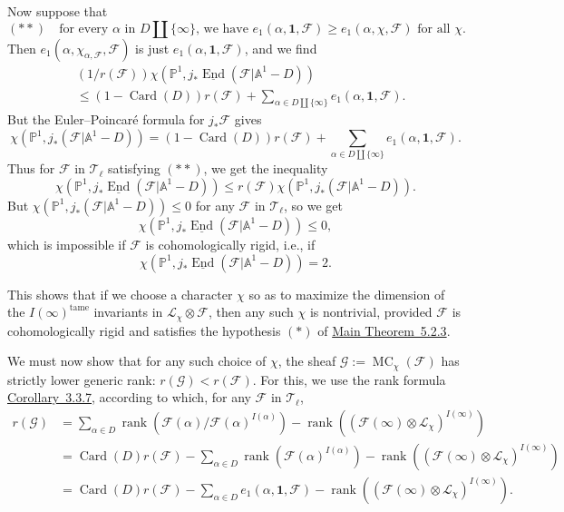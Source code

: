 Now suppose that
\[
  (**)\quad
  \text{for every \(\alpha\) in \(D\amalg\{\infty\}\), we have }
  e_1(\alpha,\mathbf{1},\mathcal{F})\geq
  e_1(\alpha,\chi,\mathcal{F})\text{ for all \(\chi\)}.
\]
Then \(e_1(\alpha,\chi_{\alpha,\mathcal{F}},\mathcal{F})\) is just
\(e_1(\alpha,\mathbf{1},\mathcal{F})\), and we find
\[
\begin{aligned}
  &(1/r(\mathcal{F}))
  \chi(\mathbb{P}^1,j_*\underline{\operatorname{End}}(\mathcal{F}\vert\mathbb{A}^1-D))\\
  &\leq
  (1-\operatorname{Card}(D))r(\mathcal{F})
  +
  \sum_{\alpha\in D\amalg\{\infty\}}
  e_1(\alpha,\mathbf{1},\mathcal{F}).
\end{aligned}
\]
But the Euler--Poincaré formula for \(j_*\mathcal{F}\) gives
\[
  \chi(\mathbb{P}^1,j_*(\mathcal{F}\vert\mathbb{A}^1-D))
  =
  (1-\operatorname{Card}(D))r(\mathcal{F})
  +
  \sum_{\alpha\in D\amalg\{\infty\}}
  e_1(\alpha,\mathbf{1},\mathcal{F}).
\]
Thus for \(\mathcal{F}\) in \(\mathcal{T}_\ell\) satisfying \((**)\), we get
the inequality
\[
  \chi(\mathbb{P}^1,j_*\underline{\operatorname{End}}(\mathcal{F}\vert\mathbb{A}^1-D))
  \leq
  r(\mathcal{F})\chi(\mathbb{P}^1,j_*(\mathcal{F}\vert\mathbb{A}^1-D)).
\]
But \(\chi(\mathbb{P}^1,j_*(\mathcal{F}\vert\mathbb{A}^1-D))\leq 0\) for any
\(\mathcal{F}\) in \(\mathcal{T}_\ell\), so we get
\[
  \chi(\mathbb{P}^1,j_*\underline{\operatorname{End}}(\mathcal{F}\vert\mathbb{A}^1-D))
  \leq 0,
\]
which is impossible if \(\mathcal{F}\) is cohomologically rigid, i.e., if
\[
  \chi(\mathbb{P}^1,j_*\underline{\operatorname{End}}(\mathcal{F}\vert\mathbb{A}^1-D))
  =2.
\]

This shows that if we choose a character \(\chi\) so as to maximize the
dimension of the \(I(\infty)^{\mathrm{tame}}\) invariants in
\(\mathcal{L}_\chi\otimes\mathcal{F}\), then any such \(\chi\) is nontrivial,
provided \(\mathcal{F}\) is cohomologically rigid and satisfies the hypothesis
\((*)\) of \hyperref[thm:5.2.3]{Main Theorem~5.2.3}.

We must now show that for any such choice of \(\chi\), the sheaf
\(\mathcal{G}:=\operatorname{MC}_\chi(\mathcal{F})\) has strictly lower generic
rank: \(r(\mathcal{G})<r(\mathcal{F})\). For this, we use the rank formula
\hyperref[cor:3.3.7]{Corollary~3.3.7}, according to which, for any
\(\mathcal{F}\) in \(\mathcal{T}_\ell\),
\[
\begin{aligned}
  r(\mathcal{G})
  &=
  \sum_{\alpha\in D}
  \operatorname{rank}(\mathcal{F}(\alpha)/\mathcal{F}(\alpha)^{I(\alpha)})
  -
  \operatorname{rank}((\mathcal{F}(\infty)\otimes\mathcal{L}_\chi)^{I(\infty)})\\
  &=
  \operatorname{Card}(D)r(\mathcal{F})
  -
  \sum_{\alpha\in D}\operatorname{rank}(\mathcal{F}(\alpha)^{I(\alpha)})
  -
  \operatorname{rank}((\mathcal{F}(\infty)\otimes\mathcal{L}_\chi)^{I(\infty)})\\
  &=
  \operatorname{Card}(D)r(\mathcal{F})
  -
  \sum_{\alpha\in D}e_1(\alpha,\mathbf{1},\mathcal{F})
  -
  \operatorname{rank}((\mathcal{F}(\infty)\otimes\mathcal{L}_\chi)^{I(\infty)}).
\end{aligned}
\]

